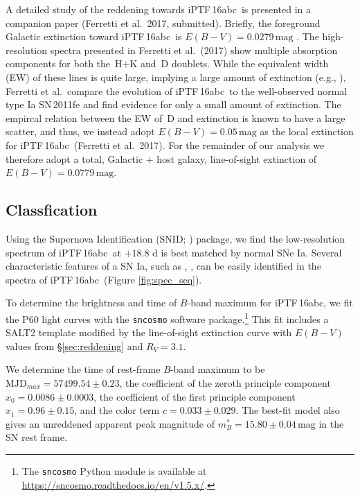 \documentclass[twocolumn]{aastex61}
\newcommand{\abc}{iPTF\,16abc}
\begin{document}
A detailed study of the reddening towards \abc\ is presented in a 
companion paper (Ferretti et al.\ 2017, submitted). Briefly, the 
foreground Galactic extinction toward \abc\
is $E(B-V) = 0.0279 \, \mathrm{mag}$ \citep{2011ApJ...737..103S}. The high-resolution spectra presented in Ferretti et al.\ (2017) show multiple absorption components for both the \,H$+$K and \,D doublets. While the equivalent width (EW) of these lines is quite large, implying a large amount of extinction (e.g., \citealt{2012MNRAS.426.1465P}), Ferretti et al.\ compare the evolution of \abc\ to the well-observed normal type Ia SN\,2011fe and find evidence for only a small amount of extinction. The empircal relation between the EW of \,D and extinction is known to have a large scatter, and thus, we instead adopt $E(B-V) = 0.05 \, \mathrm{mag}$ as the local extinction for \abc\ (Ferretti et al.\ 2017). For the remainder of our analysis we therefore adopt a total, Galactic $+$ host galaxy, line-of-sight extinction of $E(B-V) = 0.0779 \, \mathrm{mag}$.

\subsection{Classfication}
\label{sec:classification}

Using the Supernova Identification (SNID; \citealt{2007ApJ...666.1024B}) package, 
we find the low-resolution spectrum of \abc\ at $+18.8$ d is best matched by normal SNe Ia. Several characteristic features of a SN
Ia, such as \ion{Si}{2}, \ion{S}{2}, can be easily identified in the
spectra of \abc\ (Figure \ref{fig:spec_seq}).

To determine the brightness and time of $B$-band maximum for 
\abc, we fit the P60 light curves with the \texttt{sncosmo} software package.\footnote{The
  \texttt{sncosmo} Python module is available at
  \url{https://sncosmo.readthedocs.io/en/v1.5.x/}.} This fit includes a SALT2 template \citep{2007A&A...466...11G} modified by the line-of-sight extinction
curve \citep{1999PASP..111...63F} with $E(B-V)$ values from 
\S\ref{sec:reddening} and $R_V=3.1$.

We determine the time of rest-frame \textit{B}-band maximum to be 
 $\textrm{MJD}_{max}=57499.54\pm0.23$, the coefficient
of the zeroth principle component $x_0 = 0.0086 \pm 0.0003$, the
coefficient of the first principle component $x_1 = 0.96 \pm 0.15$, 
and the color term $c = 0.033 \pm 0.029$. The best-fit model also 
gives an unreddened apparent peak magnitude of $m^*_{B}=15.80 \pm 
0.04 \,\textrm{mag}$ in the SN rest frame.
\end{document}

